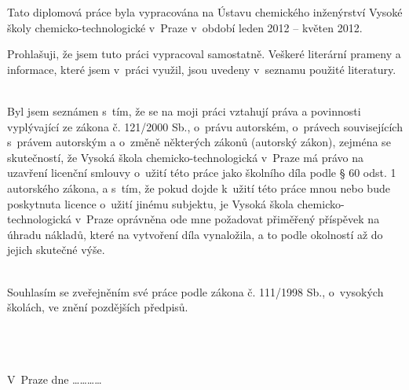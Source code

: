 \noindent Tato diplomová práce byla vypracována na Ústavu chemického inženýrství Vysoké školy chemicko-technologické v~Praze v~období leden 2012 -- květen 2012.

\vspace{11cm}
\noindent Prohlašuji, že jsem tuto práci vypracoval samostatně. Veškeré literární prameny a informace, které jsem v~práci využil, jsou uvedeny v~seznamu použité literatury.

~\\
\noindent Byl jsem seznámen s~tím, že se na moji práci vztahují práva a povinnosti vyplývající ze zákona č. 121/2000 Sb., o~právu autorském, o~právech souvisejících s~právem autorským a o~změně některých zákonů (autorský zákon), zejména se skutečností, že Vysoká škola chemicko-technologická v~Praze má právo na uzavření licenční smlouvy o~užití této práce jako školního díla podle § 60 odst. 1 autorského zákona, a s~tím, že pokud dojde k~užití této práce mnou nebo bude poskytnuta licence o~užití jinému subjektu, je Vysoká škola chemicko-technologická v~Praze oprávněna ode mne požadovat přiměřený příspěvek na úhradu nákladů, které na vytvoření díla vynaložila, a to podle okolností až do jejich skutečné výše.

~\\
\noindent Souhlasím se zveřejněním své práce podle zákona č. 111/1998 Sb., o~vysokých školách, ve znění pozdějších předpisů.

~\\
~\\
~\\
\noindent V~Praze dne \ldots\ldots\ldots\ldots

